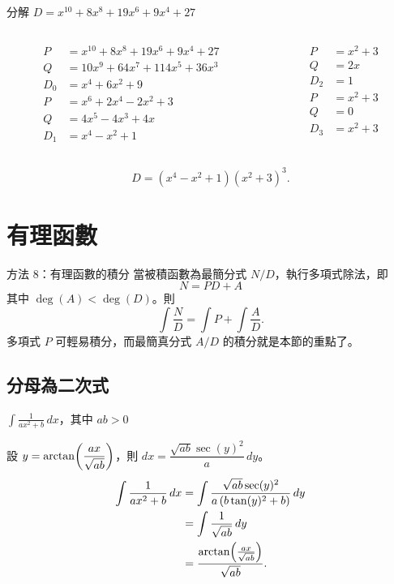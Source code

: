 \documentclass{beamer}
\newcommand{\Left} {\mathopen{}\mathclose\bgroup\left}
\newcommand{\Right}{\aftergroup\egroup\right}
\theoremstyle{remark}
\begin{document}
\begin{CJK}{UTF8}{bsmi}
\begin{frame}{分解 $D = x^{10} + 8x^8 + 19x^6 + 9x^4 + 27$}
  \begin{solution}
    \begin{columns}
      \begin{column}[t]{0.6\textwidth}
	\begin{align*}
	  P   &= x^{10} + 8x^8 + 19x^6 + 9x^4 + 27\\
	  Q   &= 10x^9 + 64x^7 + 114x^5 + 36x^3\\
	  D_0 &= x^4 + 6x^2 + 9\\
	  P   &= x^6 + 2x^4 - 2x^2 + 3\\
	  Q   &= 4x^5 - 4x^3 + 4x\\
	  D_1 &= x^4 - x^2 + 1
	\end{align*}
      \end{column}
      \begin{column}[t]{0.4\textwidth}
	\begin{align*}
	  P   &= x^2 + 3\\
	  Q   &= 2x\\
	  D_2 &= 1\\
	  P   &= x^2 + 3\\
	  Q   &= 0\\
	  D_3 &= x^2 + 3\\
	\end{align*}
      \end{column}
    \end{columns}
    \[D = \left( x^4 - x^2 + 1 \right) \left( x^2 + 3 \right)^3.\]
  \end{solution}
\end{frame}

\section{有理函數}
\begin{frame}{方法 8：有理函數的積分}
  當被積函數為最簡分式 $N/D$，執行多項式除法，即
  \[N = PD + A\]
  其中 $\deg(A) < \deg(D)$。則
  \[\int \frac N D = \int P + \int \frac A D.\]
  多項式 $P$ 可輕易積分，而最簡真分式 $A/D$ 的積分就是本節的重點了。
\end{frame}

\subsection{分母為二次式}
\begin{frame}{$\displaystyle \int \frac{1}{ax^2 + b}\,dx$，其中 $ab > 0$}
  \begin{solution}
    設 $\displaystyle y = \arctan \Left( \frac{ax}{\sqrt{ab}} \Right)$，則 $dx = \dfrac{\sqrt{ab} \sec(y)^2}{a}\,dy$。
    \begin{align*}
      \int \frac{1}{ax^2 + b}\,dx &= \int \frac{\sqrt{ab} \sec(y)^2}{a \left( b \tan(y)^2 + b \right)}\,dy\\
	&= \int \frac{1}{\sqrt{ab}}\,dy\\
	&= \frac{\arctan \Left( \frac{ax}{\sqrt{ab}} \Right)}{\sqrt{ab}}.
    \end{align*}
  \end{solution}
\end{frame}


\end{CJK}
\end{document}
